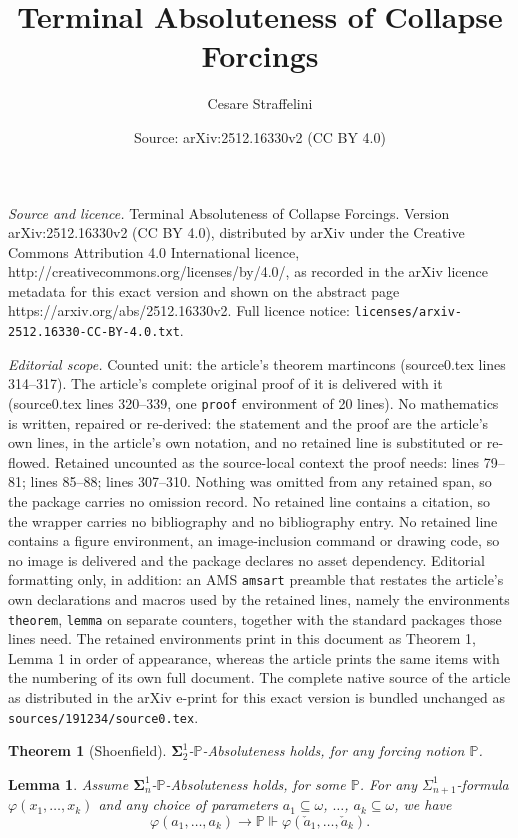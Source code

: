 \documentclass[10pt,a4paper]{amsart}
\title{{Terminal} Absoluteness of Collapse Forcings}
\author{Cesare Straffelini}
\date{Source: arXiv:2512.16330v2 (CC BY 4.0)}
\newtheorem{theorem}{Theorem}
\newtheorem{lemma}{Lemma}
\begin{document}
\maketitle

\noindent\emph{Source and licence.} {Terminal} Absoluteness of Collapse Forcings. Version arXiv:2512.16330v2 (CC BY 4.0), distributed by arXiv under the Creative Commons Attribution 4.0 International licence, http://creativecommons.org/licenses/by/4.0/, as recorded in the arXiv licence metadata for this exact version and shown on the abstract page https://arxiv.org/abs/2512.16330v2. Full licence notice: \texttt{licenses/arxiv-2512.16330-CC-BY-4.0.txt}.\par\smallskip

\noindent\textit{Editorial scope.} Counted unit: the article's theorem martincons (source0.tex lines 314--317). The article's complete original proof of it is delivered with it (source0.tex lines 320--339, one \texttt{proof} environment of 20 lines). No mathematics is written, repaired or re-derived: the statement and the proof are the article's own lines, in the article's own notation, and no retained line is substituted or re-flowed.  Retained uncounted as the source-local context the proof needs: lines 79--81; lines 85--88; lines 307--310.  Nothing was omitted from any retained span, so the package carries no omission record.  No retained line contains a citation, so the wrapper carries no bibliography and no bibliography entry.  No retained line contains a figure environment, an image-inclusion command or drawing code, so no image is delivered and the package declares no asset dependency.  Editorial formatting only, in addition: an AMS \texttt{amsart} preamble that restates the article's own declarations and macros used by the retained lines, namely the environments \texttt{theorem}, \texttt{lemma} on separate counters, together with the standard packages those lines need.  The retained environments print in this document as Theorem 1, Lemma 1 in order of appearance, whereas the article prints the same items with the numbering of its own full document.  The complete native source of the article as distributed in the arXiv e-print for this exact version is bundled unchanged as \texttt{sources/191234/source0.tex}.
\begin{theorem}[Shoenfield]\label{Shoenfield}
    $\boldsymbol\Sigma^1_2$-$\mathbb P$-Absoluteness holds, for any forcing notion $\mathbb P$.
\end{theorem}

\begin{lemma}\label{upwards}
    Assume $\boldsymbol\Sigma^1_n$-$\mathbb P$-Absoluteness holds, for some $\mathbb P$. For any $\Sigma^1_{n+1}$-formula $\varphi(x_1,\ldots,x_k)$ and any choice of parameters $a_1\subseteq\omega$, $\ldots$, $a_k\subseteq\omega$, we have
    \[\varphi(a_1,\ldots,a_k) \to \mathbb P\Vdash \varphi(\check a_1,\ldots,\check a_k).\]
\end{lemma}
\end{document}
